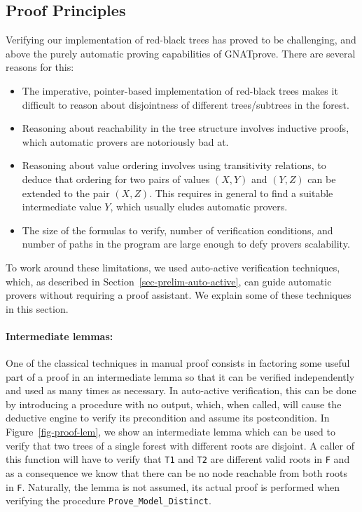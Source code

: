 \documentclass{llncs}
\newcommand{\gnatprove}{GNATprove\xspace}
\begin{document}
\subsection{Proof Principles}
\label{subsec:proof-principles}


Verifying our implementation of red-black trees has proved to be challenging,
and above the purely automatic proving capabilities of \gnatprove. There
are several reasons for this:

\begin{itemize}
 \item The imperative, pointer-based implementation of red-black trees makes it difficult
 to reason about disjointness of different trees/subtrees in the forest.
 \item Reasoning about reachability in the tree structure involves inductive proofs, which
 automatic provers are notoriously bad at.
 \item Reasoning about value ordering involves using transitivity relations,
to deduce that ordering for two pairs of values $(X,Y)$ and $(Y,Z)$ can be extended to
the pair $(X,Z)$. This requires in general to find a suitable intermediate value $Y$,
which usually eludes automatic provers.
 \item The size of the formulas to verify, number of verification conditions, and number of
 paths in the program are large enough to defy provers scalability.
\end{itemize}

To work around these limitations, we used auto-active verification techniques, which,
as described in Section~\ref{sec-prelim-auto-active}, can guide automatic provers without
requiring a proof assistant. We explain some of these techniques in this section.

\paragraph{Intermediate lemmas:}
One of the classical techniques in manual proof consists in factoring some useful
part of a proof in an intermediate lemma so that it can be verified independently and
used as many times as necessary. In auto-active verification, this can be done by introducing
a procedure with no output, which, when called, will cause the deductive engine to verify
its precondition and assume its postcondition. In Figure~\ref{fig-proof-lem}, we show an
intermediate lemma which can be used to verify that two trees of a single forest with different
roots are disjoint. A caller of this function will have to verify that \texttt{T1} and \texttt{T2} are different
valid roots in \texttt{F} and as a consequence we know that there can be no node reachable from both roots in \texttt{F}.
Naturally, the lemma is not assumed, its actual proof is performed when verifying the procedure
\texttt{Prove\_Model\_Distinct}.
\end{document}
